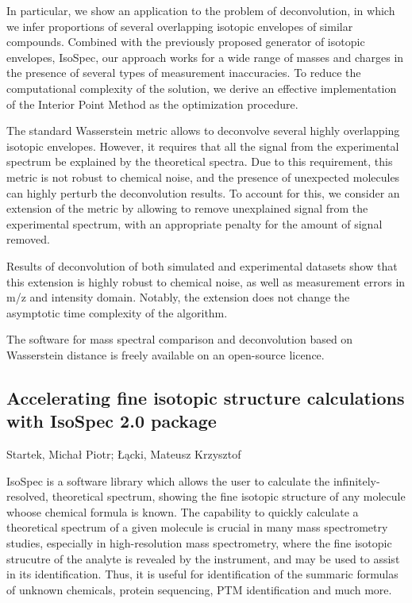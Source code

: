 {In particular, we show an application to the problem of deconvolution, in which
we infer proportions of several overlapping isotopic envelopes of similar
compounds. Combined with the previously proposed generator of isotopic
envelopes, IsoSpec, our approach works for a wide range of masses and charges
in the presence of several types of measurement inaccuracies. To reduce the
computational complexity of the solution, we derive an effective implementation
of the Interior Point Method as the optimization procedure.

The standard Wasserstein metric allows to deconvolve several highly overlapping
isotopic envelopes. However, it requires that all the signal from the
experimental spectrum be explained by the theoretical spectra. Due to this
requirement, this metric is not robust to chemical noise, and the presence of
unexpected molecules can highly perturb the deconvolution results. To account
for this, we consider an extension of the metric by allowing to remove
unexplained signal from the experimental spectrum, with an appropriate penalty
for the amount of signal removed.

Results of deconvolution of both simulated and experimental datasets show that
this extension is highly robust to chemical noise, as well as measurement
errors in m/z and intensity domain. Notably, the extension does not change the
asymptotic time complexity of the algorithm.

The software for mass spectral comparison and deconvolution based on
Wasserstein distance is freely available on an open-source licence.



\subsection*{\color{eubicRed} Accelerating fine isotopic structure calculations with IsoSpec 2.0 package}
{\color{eubicGray} Startek, Michał Piotr;
Łącki, Mateusz Krzysztof}

IsoSpec is a software library which allows the user to calculate the infinitely-resolved, theoretical spectrum, showing the fine isotopic structure of any molecule whoose chemical formula is known. The capability to quickly calculate a theoretical spectrum of a given molecule is crucial in many mass spectrometry studies, especially in high-resolution mass spectrometry, where the fine isotopic strucutre of the analyte is revealed by the instrument, and may be used to assist in its identification. Thus, it is useful for identification of the summaric formulas of unknown chemicals, protein sequencing, PTM identification and much more.

}
